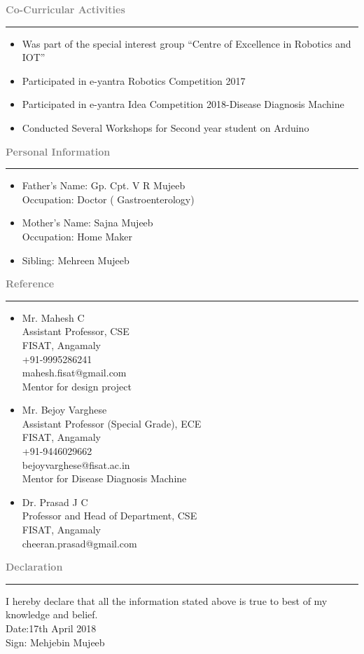 \documentclass[11.5pt,a4paper]{article}
\begin{document}
\textbf{\textcolor{gray}{\huge Co-Curricular Activities}}\\ \hrule
\begin{itemize}
\item Was part of the special interest group “Centre of Excellence in Robotics and IOT”
\item Participated in e-yantra Robotics Competition 2017
\item Participated in e-yantra Idea Competition 2018-Disease Diagnosis Machine
\item Conducted Several Workshops for Second year student on Arduino

\end{itemize}


\textbf{\textcolor{gray}{\huge Personal Information}}\\ \hrule
\begin{itemize}
\item Father’s Name: Gp. Cpt. V R Mujeeb\\
Occupation: Doctor ( Gastroenterology)
\item Mother’s Name: Sajna Mujeeb\\
Occupation: Home Maker
\item Sibling: Mehreen Mujeeb
\end{itemize}

\textbf{\textcolor{gray}{\huge Reference}}\\ \hrule
\begin{itemize}
\item Mr. Mahesh C\\
 Assistant Professor, CSE\\
           FISAT, Angamaly\\
	 +91-9995286241\\
	 mahesh.fisat@gmail.com\\
	 Mentor for design project\\
\item  Mr. Bejoy Varghese\\
	Assistant Professor (Special Grade), ECE\\
	FISAT, Angamaly\\
	+91-9446029662\\
	bejoyvarghese@fisat.ac.in\\
	Mentor for Disease Diagnosis Machine\\
\item  Dr. Prasad J C\\
	Professor and Head of Department, CSE\\
	FISAT, Angamaly\\
	cheeran.prasad@gmail.com\\
\end{itemize}

\textbf{\textcolor{gray}{\huge Declaration}}\\ \hrule

I hereby declare that all the information stated above is true to best of my knowledge and belief.\\
Date:17th April 2018\\
Sign: Mehjebin Mujeeb
\end{document}
